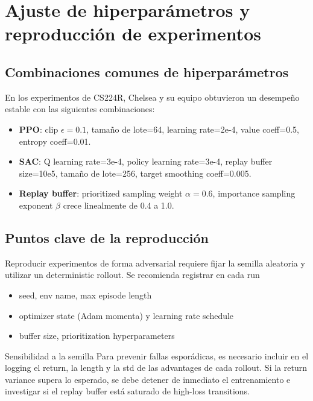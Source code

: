 \documentclass[a4paper]{article}
\begin{document}
\section{Ajuste de hiperparámetros y reproducción de experimentos}

\subsection{Combinaciones comunes de hiperparámetros}

En los experimentos de CS224R, Chelsea y su equipo obtuvieron un desempeño estable con las siguientes combinaciones:

\begin{itemize}
    \item \textbf{PPO}: clip $\epsilon=0.1$, tamaño de lote=64, learning rate=2e-4, value coeff=0.5, entropy coeff=0.01.
    \item \textbf{SAC}: Q learning rate=3e-4, policy learning rate=3e-4, replay buffer size=10e5, tamaño de lote=256, target smoothing coeff=0.005.
    \item \textbf{Replay buffer}: prioritized sampling weight $\alpha=0.6$, importance sampling exponent $\beta$ crece linealmente de 0.4 a 1.0.
\end{itemize}

\subsection{Puntos clave de la reproducción}

Reproducir experimentos de forma adversarial requiere fijar la semilla aleatoria y utilizar un deterministic rollout. Se recomienda registrar en cada run

\begin{itemize}
    \item seed, env name, max episode length
    \item optimizer state (Adam momenta) y learning rate schedule
    \item buffer size, prioritization hyperparameters
\end{itemize}

\begin{warningbox}{Sensibilidad a la semilla}
Para prevenir fallas esporádicas, es necesario incluir en el logging el return, la length y la std de las advantages de cada rollout. Si la return variance supera lo esperado, se debe detener de inmediato el entrenamiento e investigar si el replay buffer está saturado de high-loss transitions.
\end{warningbox}
\end{document}
